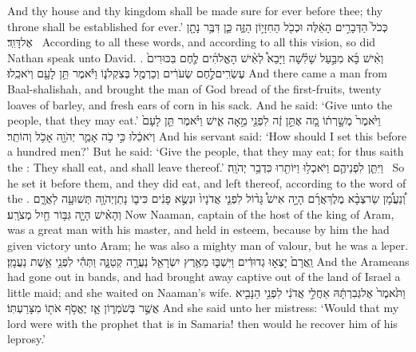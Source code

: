 {And thy house and thy kingdom shall be made sure for ever before thee; thy throne shall be established for ever.’}
{כְּכֹל֙ הַדְּבָרִ֣ים הָאֵ֔לֶּה וּכְכֹ֖ל הַחִזָּי֣וֹן הַזֶּ֑ה כֵּ֛ן דִּבֶּ֥ר נָתָ֖ן אֶל\maqqaf דָּוִֽד׃ \petucha }
{According to all these words, and according to all this vision, so did Nathan speak unto David. .}
\newperek
{}
\label{haft_27}
\setcounter{chap}{4}
\setcounter{verse}{42}
{וְאִ֨ישׁ בָּ֜א מִבַּ֣עַל שָׁלִ֗שָׁה וַיָּבֵא֩ לְאִ֨ישׁ הָאֱלֹהִ֜ים לֶ֤חֶם בִּכּוּרִים֙ עֶשְׂרִֽים\maqqaf לֶ֣חֶם שְׂעֹרִ֔ים וְכַרְמֶ֖ל בְּצִקְלֹנ֑וֹ וַיֹּ֕אמֶר תֵּ֥ן לָעָ֖ם וְיֹאכֵֽלוּ׃}
{And there came a man from Baal-shalishah, and brought the man of God bread of the first-fruits, twenty loaves of barley, and fresh ears of corn in his sack. And he said: ‘Give unto the people, that they may eat.’}
{וַיֹּ֙אמֶר֙ מְשָׁ֣רְת֔וֹ מָ֚ה אֶתֵּ֣ן זֶ֔ה לִפְנֵ֖י מֵ֣אָה אִ֑ישׁ וַיֹּ֗אמֶר תֵּ֤ן לָעָם֙ וְיֹאכֵ֔לוּ כִּ֣י כֹ֥ה אָמַ֛ר יְהֹוָ֖ה אָכֹ֥ל וְהוֹתֵֽר׃}
{And his servant said: ‘How should I set this before a hundred men?’ But he said: ‘Give the people, that they may eat; for thus saith the \lord: They shall eat, and shall leave thereof.’}
{וַיִּתֵּ֧ן לִפְנֵיהֶ֛ם וַיֹּאכְל֥וּ וַיּוֹתִ֖רוּ כִּדְבַ֥ר יְהֹוָֽה׃ \petucha }
{So he set it before them, and they did eat, and left thereof, according to the word of the \lord.}
\newperek
{}
{וְ֠נַעֲמָ֠ן שַׂר\maqqaf צְבָ֨א מֶלֶךְ\maqqaf אֲרָ֜ם הָיָ֣ה אִישׁ֩ גָּד֨וֹל לִפְנֵ֤י אֲדֹנָיו֙ וּנְשֻׂ֣א פָנִ֔ים כִּי\maqqaf ב֛וֹ נָתַן\maqqaf יְהֹוָ֥ה תְּשׁוּעָ֖ה לַאֲרָ֑ם וְהָאִ֗ישׁ הָיָ֛ה גִּבּ֥וֹר חַ֖יִל מְצֹרָֽע׃}
{Now Naaman, captain of the host of the king of Aram, was a great man with his master, and held in esteem, because by him the \lord\space had given victory unto Aram; he was also a mighty man of valour, but he was a leper.}
{וַֽאֲרָם֙ יָצְא֣וּ גְדוּדִ֔ים וַיִּשְׁבּ֛וּ מֵאֶ֥רֶץ יִשְׂרָאֵ֖ל נַעֲרָ֣ה קְטַנָּ֑ה וַתְּהִ֕י לִפְנֵ֖י אֵ֥שֶׁת נַעֲמָֽן׃}
{And the Arameans had gone out in bands, and had brought away captive out of the land of Israel a little maid; and she waited on Naaman’s wife.}
{וַתֹּ֙אמֶר֙ אֶל\maqqaf גְּבִרְתָּ֔הּ אַחֲלֵ֣י אֲדֹנִ֔י לִפְנֵ֥י הַנָּבִ֖יא אֲשֶׁ֣ר בְּשֹׁמְר֑וֹן אָ֛ז יֶאֱסֹ֥ף אֹת֖וֹ מִצָּרַעְתּֽוֹ׃}
{And she said unto her mistress: ‘Would that my lord were with the prophet that is in Samaria! then would he recover him of his leprosy.’}
